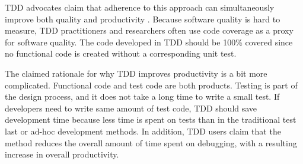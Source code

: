 \documentclass[smallextended]{svjour3}     %
\begin{document}


TDD advocates claim that adherence to this approach can simultaneously improve both quality 
and productivity \cite{Beck:01,Janzen:05}.   Because software quality is hard to measure, 
TDD practitioners and researchers often use code coverage as 
a proxy for software quality. The code developed in TDD 
should be 100\% covered since no functional code is created without a corresponding unit test. 

The claimed rationale for why TDD improves productivity is a bit more
complicated. Functional code and test code are both products. Testing is
part of the design process, and it does not take a long time to write a
small test. If developers need to write same amount of test code, TDD
should save development time because less time is spent on tests than in
the traditional test last or ad-hoc development methods. In addition, TDD
users claim that the method reduces the overall amount of time spent on
debugging, with a resulting increase in overall
productivity\cite{Williams:03}.
\end{document}
